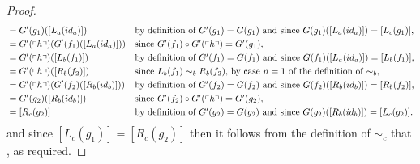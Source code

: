 \begin{proof}
\begin{align*}
[L_c(g_1)]
&= G'(g_1)([L_a(id_a)])     
 	& & \mbox{by definition of $G'(g_1)=G(g_1)$ 
 			            and since $G(g_1)([L_a(id_a)])=[L_c(g_1)]$,}\\
&= G'(\qq{h}) (G'(f_1)([L_a(id_a)])) 
	& & \mbox{since $G'(f_1) \circ G'(\qq{h}) = G'(g_1)$,}  \\
&= G'(\qq{h}) ([L_b(f_1)])       
	& & \mbox{by definition of $G'(f_1)=G(f_1)$
	                            and since $G(f_1)([L_a(id_a)]) = [L_b(f_1)]$,} \\
&= G'(\qq{h}) ([R_b(f_2)])       
	& & \mbox{since $L_b(f_1) \sim_b R_b(f_2)$, by case $n=1$ of the definition of $\sim_b$,} \\
&= G'(\qq{h}) (G'(f_2)([R_b(id_b)])) 
	& & \mbox{by definition of $G'(f_2)=G(f_2)$ 
	                            and since $G(f_2)([R_b(id_b)]) = [R_b(f_2)]$,}\\
&= G'(g_2)([R_b(id_b)])              
	& & \mbox{since $G'(f_2) \circ G'(\qq{h}) = G'(g_2)$,}  \\
&= [R_c(g_2)]                        
	& & \mbox{by definition of $G'(g_2)=G(g_2)$
 			            and since $G(g_2)([R_b(id_b)])=[L_c(g_2)]$.}   
\end{align*} 
and since $[L_c(g_1)]=[R_c(g_2)]$ then it follows from the definition of $\sim_c$ that 
, as required.
\end{proof}

